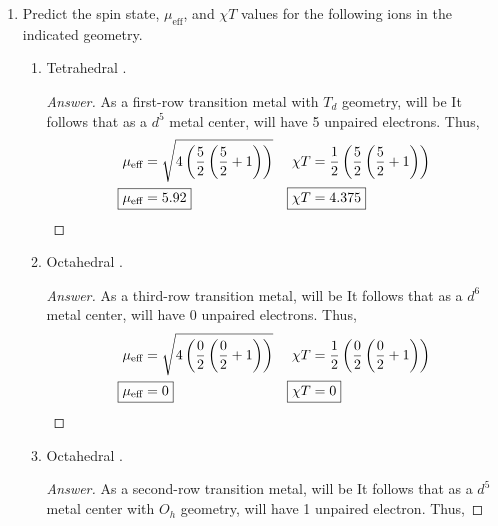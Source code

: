 \documentclass[../psets.tex]{subfiles}
\begin{document}
\begin{enumerate}
\begin{proof}[Answer]
\begin{center}
        \end{center}
    \end{proof}
    \item Predict the spin state, $\mu_\text{eff}$, and $\chi T$ values for the following ions in the indicated geometry.
    \begin{enumerate}
        \item Tetrahedral .
        \begin{proof}[Answer]



            As a first-row transition metal with $T_d$ geometry,  will be  It follows that as a $d^5$ metal center,  will have 5 unpaired electrons. Thus,
            \begin{align*}
                \mu_\text{eff} &= \sqrt{4\left( \frac{5}{2}\left( \frac{5}{2}+1 \right) \right)}&
                    \chi T &= \frac{1}{2}\left( \frac{5}{2}\left( \frac{5}{2}+1 \right) \right)\\
                \Aboxed{\mu_\text{eff} &= 5.92}&
                    \Aboxed{\chi T &= 4.375}
            \end{align*}
        \end{proof}
        \item Octahedral .
        \begin{proof}[Answer]
            As a third-row transition metal,  will be  It follows that as a $d^6$ metal center,  will have 0 unpaired electrons. Thus,
            \begin{align*}
                \mu_\text{eff} &= \sqrt{4\left( \frac{0}{2}\left( \frac{0}{2}+1 \right) \right)}&
                    \chi T &= \frac{1}{2}\left( \frac{0}{2}\left( \frac{0}{2}+1 \right) \right)\\
                \Aboxed{\mu_\text{eff} &= 0}&
                    \Aboxed{\chi T &= 0}
            \end{align*}
        \end{proof}
        \item Octahedral .
        \begin{proof}[Answer]
            As a second-row transition metal,  will be  It follows that as a $d^5$ metal center with $O_h$ geometry,  will have 1 unpaired electron. Thus,

\end{proof}
\end{enumerate}
\end{enumerate}
\end{document}
